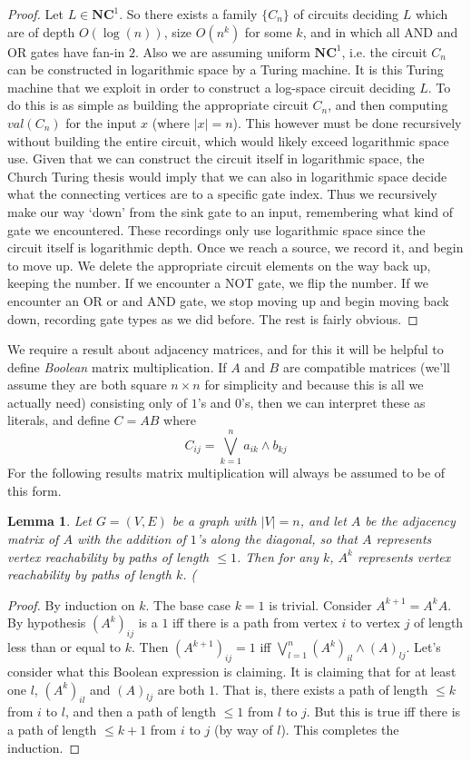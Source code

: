 \documentclass{article}
\theoremstyle{definition}
\theoremstyle{plain}
\theoremstyle{theorem}
\newtheorem{lemma}{Lemma}[section]
\begin{document}
\begin{proof}
	Let $L \in \bm{NC}^1$. So there exists a family $\{C_n\}$ of circuits deciding $L$ which are of depth $O(\log(n))$, size $O(n^k)$ for some $k$, and in which all AND and OR gates have fan-in $2$. Also we are assuming uniform $\bm{NC}^1$, i.e. the circuit $C_n$ can be constructed in logarithmic space by a Turing machine. It is this Turing machine that we exploit in order to construct a log-space circuit deciding $L$. To do this is as simple as building the appropriate circuit $C_n$, and then computing $val(C_n)$ for the input $x$ (where $|x| = n$). This however must be done recursively without building the entire circuit, which would likely exceed logarithmic space use. Given that we can construct the circuit itself in logarithmic space, the Church Turing thesis would imply that we can also in logarithmic space decide what the connecting vertices are to a specific gate index. Thus we recursively make our way `down' from the sink gate to an input, remembering what kind of gate we encountered. These recordings only use logarithmic space since the circuit itself is logarithmic depth. Once we reach a source, we record it, and begin to move up. We delete the appropriate circuit elements on the way back up, keeping the number. If we encounter a NOT gate, we flip the number. If we encounter an OR or and AND gate, we stop moving up and begin moving back down, recording gate types as we did before. The rest is fairly obvious. 
\end{proof}
We require a result about adjacency matrices, and for this it will be helpful to define \emph{Boolean} matrix multiplication. If $A$ and $B$ are compatible matrices (we'll assume they are both square $n \times n$ for simplicity and because this is all we actually need) consisting only of $1$'s and $0$'s, then we can interpret these as literals, and define $C = AB$ where 
\[ C_{ij} = \bigvee_{k=1}^n a_{ik} \wedge b_{kj} \] 
For the following results matrix multiplication will always be assumed to be of this form.
\begin{lemma}
	Let $G = (V,E)$ be a graph with $|V| = n$, and let $A$ be the adjacency matrix of $A$ with the addition of $1$'s along the diagonal, so that $A$ represents vertex reachability by paths of length $\leq 1$. Then for any $k$, $A^k$ represents vertex reachability by paths of length $k$. (
\end{lemma}
\begin{proof}
	By induction on $k$. The base case $k=1$ is trivial. Consider $A^{k+1} = A^kA$. By hypothesis $(A^k)_{ij}$ is a $1$ iff there is a path from vertex $i$ to vertex $j$ of length less than or equal to $k$. Then $(A^{k+1})_{ij} = 1$ iff $\bigvee_{l=1}^n (A^k)_{il} \wedge (A)_{lj}$. Let's consider what this Boolean expression is claiming. It is claiming that for at least one $l$, $(A^k)_{il}$ and $(A)_{lj}$ are both $1$. That is, there exists a path of length $\leq k$ from $i$ to $l$, and then a path of length $\leq 1$ from $l$ to $j$. But this is true iff there is a path of length $\leq k+1$ from $i$ to $j$ (by way of $l$). This completes the induction. 
\end{proof}
\end{document}
